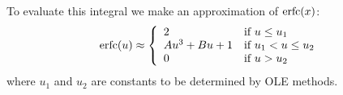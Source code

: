 \documentclass{book}
\begin{document}
To evaluate this integral we make an approximation of $\text{erfc}(x)$:
\begin{equation*}
  \text{erfc}(u) \approx \left\{
  \begin{array}{ll}
    2 & \text{if } u \leq u_1 \\
    Au^3 + Bu + 1 & \text{if } u_1 < u \leq u_2 \\
    0 & \text{if } u > u_2
  \end{array}
  \right.
\end{equation*}
where $u_1$ and $u_2$ are constants to be determined by OLE methods.
\end{document}
